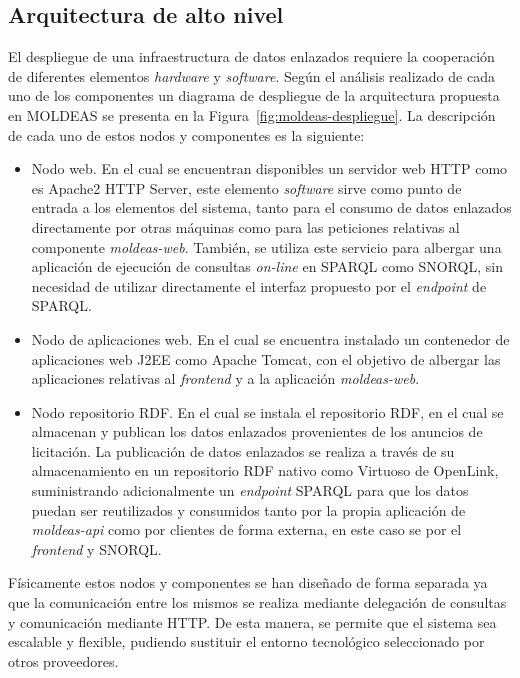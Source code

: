 \subsection{Arquitectura de alto nivel}
El despliegue de una infraestructura de datos enlazados requiere la cooperación de diferentes elementos 
\textit{hardware} y \textit{software}. Según el análisis realizado de cada uno de los componentes un diagrama 
de despliegue de la arquitectura propuesta en MOLDEAS se presenta en la Figura~\ref{fig:moldeas-despliegue}. 
La descripción de cada uno de estos nodos y componentes es la siguiente:

\begin{itemize}

\item Nodo web. En el cual se encuentran disponibles un servidor web \gls{HTTP} como es Apache2 HTTP Server, este elemento \textit{software} sirve como punto 
de entrada a los elementos del sistema, tanto para el consumo de datos enlazados directamente por otras máquinas como para las peticiones 
relativas al componente \textit{moldeas-web}. También, se utiliza este servicio para albergar una aplicación 
de ejecución de consultas \textit{on-line} en SPARQL como \gls{SNORQL}, sin necesidad de utilizar directamente 
el interfaz propuesto por el \textit{endpoint} de SPARQL.

\item Nodo de aplicaciones web. En el cual se encuentra instalado un contenedor de aplicaciones web \gls{J2EE} como Apache Tomcat, 
con el objetivo de albergar las aplicaciones relativas al \linkeddata \textit{frontend} y a la aplicación \textit{moldeas-web}. 

\item Nodo repositorio RDF. En el cual se instala el repositorio \gls{RDF}, en el cual se almacenan y publican 
los datos enlazados provenientes de los anuncios de licitación. La publicación de datos enlazados se realiza a través de su almacenamiento 
en un repositorio RDF nativo como Virtuoso de OpenLink, suministrando adicionalmente un \textit{endpoint} SPARQL para que los 
datos puedan ser reutilizados y consumidos tanto por la propia aplicación de \textit{moldeas-api} como por clientes 
de forma externa, en este caso se por el \linkeddata \textit{frontend} y SNORQL.

\end{itemize}

Físicamente estos nodos y componentes se han diseñado de forma separada ya que la comunicación entre los mismos 
se realiza mediante delegación de consultas y comunicación mediante HTTP. De esta manera, se permite que el sistema 
sea escalable y flexible, pudiendo sustituir el entorno tecnológico seleccionado por otros proveedores.


